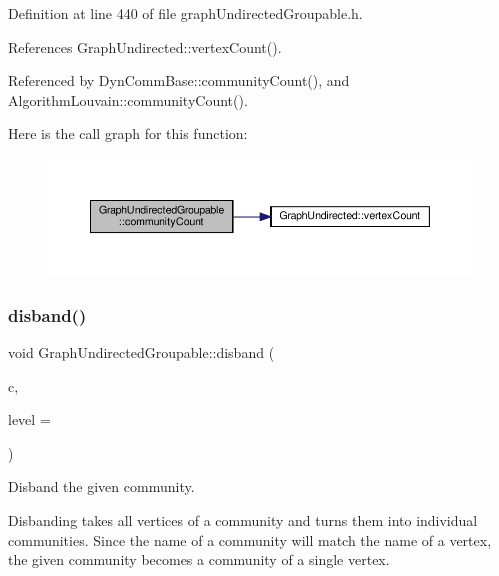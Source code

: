 Definition at line 440 of file graph\+Undirected\+Groupable.\+h.



References Graph\+Undirected\+::vertex\+Count().



Referenced by Dyn\+Comm\+Base\+::community\+Count(), and Algorithm\+Louvain\+::community\+Count().

Here is the call graph for this function\+:
\nopagebreak
\begin{figure}[H]
\begin{center}
\leavevmode
\includegraphics[width=350pt]{classGraphUndirectedGroupable_adf6ebb83c3df6317f122a13650309ac4_cgraph}
\end{center}
\end{figure}
\mbox{\label{classGraphUndirectedGroupable_ac82f4c93994c372d05a660b36cdce8f3}} 
\subsubsection{\texorpdfstring{disband()}{disband()}}
{\footnotesize\ttfamily void Graph\+Undirected\+Groupable\+::disband (\begin{DoxyParamCaption}\item[{const \hyperlink{graphUndirectedGroupable_8h_a914da95c9ea7f14f4b7f875c36818556}{type\+Community} \&}]{c,  }\item[{const unsigned int \&}]{level = {} }\end{DoxyParamCaption})\hspace{0.3cm}{\ttfamily [inline]}}



Disband the given community. 

Disbanding takes all vertices of a community and turns them into individual communities. Since the name of a community will match the name of a vertex, the given community becomes a community of a single vertex.



